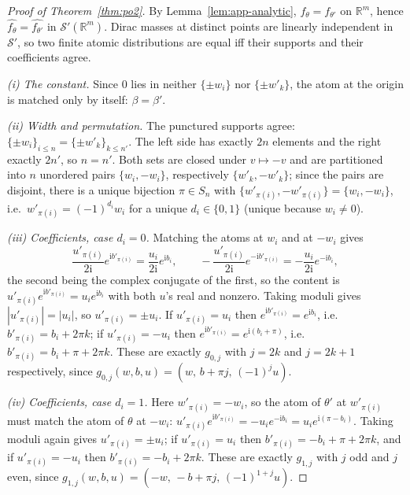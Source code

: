 \documentclass[10pt,twocolumn,letterpaper]{article}
\theoremstyle{definition}
\newcommand{\R}{\mathbb{R}}
\begin{document}
\begin{proof}[Proof of Theorem~\ref{thm:po2}]
By Lemma~\ref{lem:app-analytic}, $f_\theta = f_{\theta'}$ on $\R^m$, hence
$\widehat{f_\theta} = \widehat{f_{\theta'}}$ in $\mathcal S'(\R^m)$. Dirac masses at distinct
points are linearly independent in $\mathcal S'$, so two finite atomic distributions are equal iff
their supports and their coefficients agree.

\emph{(i) The constant.} Since $0$ lies in neither $\{\pm w_i\}$ nor $\{\pm w'_k\}$, the atom at
the origin is matched only by itself: $\beta = \beta'$.

\emph{(ii) Width and permutation.} The punctured supports agree:
$\{\pm w_i\}_{i\le n} = \{\pm w'_k\}_{k \le n'}$. The left side has exactly $2n$ elements and the
right exactly $2n'$, so $n = n'$. Both sets are closed under $v \mapsto -v$ and are partitioned
into $n$ unordered pairs $\{w_i,-w_i\}$, respectively $\{w'_k,-w'_k\}$; since the pairs are
disjoint, there is a unique bijection $\pi \in S_n$ with
$\{w'_{\pi(i)}, -w'_{\pi(i)}\} = \{w_i, -w_i\}$, i.e.\ $w'_{\pi(i)} = (-1)^{d_i} w_i$ for a unique
$d_i \in \{0,1\}$ (unique because $w_i \neq 0$).

\emph{(iii) Coefficients, case $d_i = 0$.} Matching the atoms at $w_i$ and at $-w_i$ gives
\[
\frac{u'_{\pi(i)}}{2\mathrm i}e^{\mathrm i b'_{\pi(i)}} = \frac{u_i}{2\mathrm i}e^{\mathrm i b_i},
\qquad
-\frac{u'_{\pi(i)}}{2\mathrm i}e^{-\mathrm i b'_{\pi(i)}} = -\frac{u_i}{2\mathrm i}e^{-\mathrm i b_i},
\]
the second being the complex conjugate of the first, so the content is
$u'_{\pi(i)} e^{\mathrm i b'_{\pi(i)}} = u_i e^{\mathrm i b_i}$ with both $u$'s real and nonzero.
Taking moduli gives $|u'_{\pi(i)}| = |u_i|$, so $u'_{\pi(i)} = \pm u_i$. If $u'_{\pi(i)} = u_i$
then $e^{\mathrm i b'_{\pi(i)}} = e^{\mathrm i b_i}$, i.e.\ $b'_{\pi(i)} = b_i + 2\pi k$; if
$u'_{\pi(i)} = -u_i$ then $e^{\mathrm i b'_{\pi(i)}} = e^{\mathrm i (b_i + \pi)}$, i.e.\
$b'_{\pi(i)} = b_i + \pi + 2\pi k$. These are exactly $g_{0,j}$ with $j = 2k$ and $j = 2k+1$
respectively, since $g_{0,j}(w,b,u) = (w,\, b + \pi j,\, (-1)^j u)$.

\emph{(iv) Coefficients, case $d_i = 1$.} Here $w'_{\pi(i)} = -w_i$, so the atom of $\theta'$ at
$w'_{\pi(i)}$ must match the atom of $\theta$ at $-w_i$:
$u'_{\pi(i)}e^{\mathrm i b'_{\pi(i)}} = -u_i e^{-\mathrm i b_i} = u_i e^{\mathrm i(\pi - b_i)}$.
Taking moduli again gives $u'_{\pi(i)} = \pm u_i$; if $u'_{\pi(i)} = u_i$ then
$b'_{\pi(i)} = -b_i + \pi + 2\pi k$, and if $u'_{\pi(i)} = -u_i$ then
$b'_{\pi(i)} = -b_i + 2\pi k$. These are exactly $g_{1,j}$ with $j$ odd and $j$ even, since
$g_{1,j}(w,b,u) = (-w,\, -b + \pi j,\, (-1)^{1+j}u)$.


\end{proof}
\end{document}
